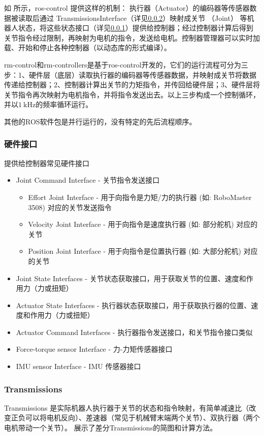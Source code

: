 如 所示，ros-control 提供这样的机制： 执行器（Actuator）的编码器等传感器数据被读取后通过 TransmissionsInterface（详见\ref{transmission}）映射成关节 （Joint） 等机器人状态，将这些状态接口（详见\ref{hardwareinterface}）提供给控制器；经过控制器计算后得到关节指令经过限制，再映射为电机的指令，发送给电机。控制器管理器可以实时加载、开始和停止各种控制器（以动态库的形式编译）。


rm-control和rm-controllers是基于ros-control开发的，它们的运行流程可分为三步：1、硬件层（底层）读取执行器的编码器等传感器数据，并映射成关节将数据传递给控制器；2、控制器计算出关节的力矩指令，并传回给硬件层；3、硬件层将关节指令再次映射为电机指令，并将指令发送出去。以上三步构成一个控制循环，并以$\qty{1}{\kHz}$的频率循环运行。

其他的ROS软件包是并行运行的，没有特定的先后流程顺序。



\subsubsection{硬件接口} \label{hardwareinterface}
提供给控制器常见硬件接口
\begin{itemize}
    \item Joint Command Interface - 关节指令发送接口
    \begin{itemize}
        \item Effort Joint Interface - 用于向指令是力矩/力的执行器 (如: RoboMaster 3508) 对应的关节发送指令
        \item Velocity Joint Interface  - 用于向指令是速度执行器 (如: 部分舵机) 对应的关节
        \item Position Joint Interface  - 用于向指令是位置执行器 (如: 大部分舵机) 对应的关节
    \end{itemize}
    \item Joint State Interfaces - 关节状态获取接口，用于获取关节的位置、速度和作用力（力或扭矩）
    \item Actuator State Interfaces - 执行器状态获取接口，用于获取执行器的位置、速度和作用力（力或扭矩）
    \item Actuator Command Interfaces - 执行器指令发送接口，和关节指令接口类似
    \item Force-torque sensor Interface - 力-力矩传感器接口
    \item IMU sensor Interface - IMU 传感器接口
\end{itemize}

\subsubsection{Transmissions} \label{transmission}
Transmissions 是实际机器人执行器于关节的状态和指令映射，有简单减速比（改变正负可以将电机反向）、差速器（常见于机械臂末端两个关节）、双执行器（两个电机带动一个关节）。  展示了差分Transmissions的简图和计算方法。

